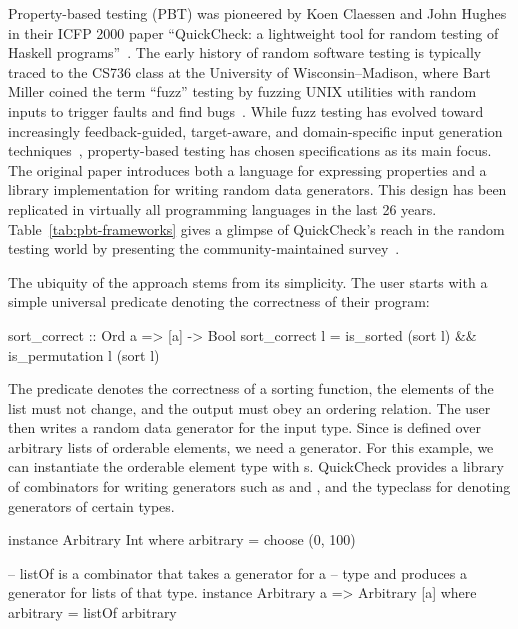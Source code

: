 Property-based testing (PBT) was pioneered by Koen Claessen and John Hughes in their
ICFP 2000 paper ``QuickCheck: a lightweight tool for random testing of Haskell
programs''~\cite{ClaessenH00}. The early history of random software testing is
typically traced to the CS736 class at the University of Wisconsin--Madison, where Bart
Miller coined the term ``fuzz'' testing by fuzzing UNIX utilities with random inputs to
trigger faults and find bugs~\cite{Miller1990UnixFuzz}. While fuzz testing has evolved
toward increasingly feedback-guided, target-aware, and domain-specific input generation
techniques~\cite{fuzzingbook2024,aflplusplus,DBLP:journals/tse/BohmePR19,FairFuzz,DirectedGreybox,FuzzFactory},
property-based testing has chosen specifications as its main focus. The original paper
introduces both a language for expressing properties and a library implementation for
writing random data generators. This design has been replicated in virtually all
programming languages in the last 26 years. Table~\ref{tab:pbt-frameworks} gives a
glimpse of QuickCheck's reach in the random testing world by presenting the
community-maintained  survey~\cite{jmid-pbt-frameworks}.

The ubiquity of the approach stems from its simplicity. The user starts with a simple
universal predicate denoting the correctness of their program:

\begin{code}[language=Haskell,emph={sort_correct,is_sorted,sort,is_permutation},emph={[2]l}]
sort_correct :: Ord a => [a] -> Bool
sort_correct l = is_sorted (sort l) && is_permutation l (sort l)
\end{code}

The  predicate denotes the correctness of a sorting function, the
elements of the list must not change, and the output must obey an ordering relation.
The user then writes a random data generator for the input type. Since
 is defined over arbitrary lists of orderable elements, we need a
 generator. For this example, we can instantiate the orderable element type
with s. QuickCheck provides a library of combinators for writing generators
such as  and , and the  typeclass for
denoting generators of certain types.

\begin{code}[language=Haskell,emph={arbitrary,choose,listOf},emph={[2]a}]
instance Arbitrary Int where
    arbitrary = choose (0, 100)

-- listOf is a combinator that takes a generator for a
-- type and produces a generator for lists of that type.
instance Arbitrary a => Arbitrary [a] where
    arbitrary = listOf arbitrary
\end{code}

